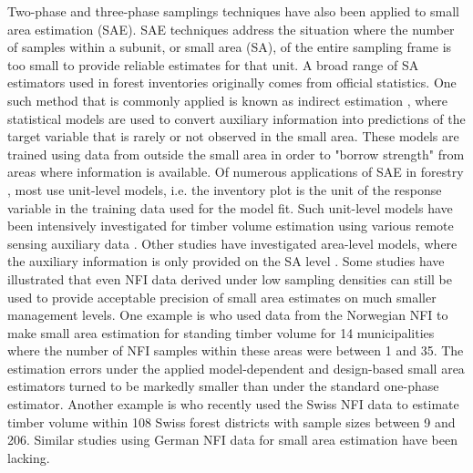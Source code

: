 \documentclass[remotesensing,article,submit,moreauthors,pdftex,10pt,a4paper]{mdpi}
\begin{document}
Two-phase and three-phase samplings techniques have also been applied to small area estimation (SAE). SAE techniques address the situation where the number of samples within a subunit, or small area (SA), of the entire sampling frame is too small to provide reliable estimates for that unit. A broad range of SA estimators used in forest inventories \citep{kohl2006} originally comes from official statistics. One such method that is commonly applied is known as indirect estimation \citep{rao2015}, where statistical models are used to convert auxiliary information into predictions of the target variable that is rarely or not observed in the small area. These models are trained using data from outside the small area in order to "borrow strength" from areas where information is available. Of numerous applications of SAE in forestry \citep{breidenbach2012, goerndt2011, steinmann2013, mandallaz2013b}, most use unit-level models, i.e. the inventory plot is the unit of the response variable in the training data used for the model fit. Such unit-level models have been intensively investigated for timber volume estimation using various remote sensing auxiliary data \citep{koch2010, naesset2014inmaltamo}. Other studies have investigated area-level models, where the auxiliary information is only provided on the SA level \citep{magnussen2017}. Some studies have illustrated that even NFI data derived under low sampling densities can still be used to provide acceptable precision of small area estimates on much smaller management levels. One example is \citet{breidenbach2012} who used data from the Norwegian NFI to make small area estimation for standing timber volume for 14 municipalities where the number of NFI samples within these areas were between 1 and 35. The estimation errors under the applied model-dependent and design-based small area estimators turned to be markedly smaller than under the standard one-phase estimator. Another example is \citet{magnussen2014} who recently used the Swiss NFI data to estimate timber volume within 108 Swiss forest districts with sample sizes between 9 and 206. Similar studies using German NFI data for small area estimation have been lacking.\par
\end{document}
